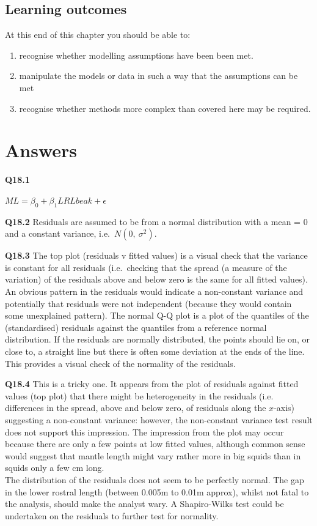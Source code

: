 \documentclass[
  oneside]{krantz}
\providecommand{\tightlist}{%
  \setlength{\itemsep}{0pt}\setlength{\parskip}{0pt}}
\begin{document}
\hypertarget{learning-outcomes-10}{%
\subsection{Learning outcomes}\label{learning-outcomes-10}}

At this end of this chapter you should be able to:

\begin{enumerate}
\def\labelenumi{\arabic{enumi}.}
\tightlist
\item
  recognise whether modelling assumptions have been been met.
\item
  manipulate the models or data in such a way that the assumptions can be met
\item
  recognise whether methods more complex than covered here may be required.
\end{enumerate}

\hypertarget{ANSdiag}{%
\section{Answers}\label{ANSdiag}}

\textbf{Q18.1}

\(ML= \beta_0+\beta_1LRLbeak+ \epsilon\)

\textbf{Q18.2} Residuals are assumed to be from a normal distribution with a mean = 0 and a constant variance, i.e.~\(N(0,\ {\sigma{}}^2)\).

\textbf{Q18.3} The top plot (residuals v fitted values) is a visual check that the variance is
constant for all residuals (i.e.~checking that the spread (a measure of the
variation) of the residuals above and below zero is the same for all fitted
values). An obvious pattern in the residuals would indicate a non-constant
variance and potentially that residuals were not independent (because they would
contain some unexplained pattern).
The normal Q-Q plot is a plot of the quantiles of the (standardised) residuals
against the quantiles from a reference normal distribution. If the residuals are
normally distributed, the points should lie on, or close to, a straight line but
there is often some deviation at the ends of the line. This provides a visual
check of the normality of the residuals.

\textbf{Q18.4} This is a tricky one. It appears from the plot of residuals against fitted
values (top plot) that there might be heterogeneity in the residuals (i.e.
differences in the spread, above and below zero, of residuals along the
\(x\)-axis) suggesting a non-constant variance: however, the non-constant
variance test result does not support this impression. The impression from the
plot may occur because there are only a few points at low fitted values, although
common sense would suggest that mantle length might vary rather more in big
squids than in squids only a few cm long.\\
The distribution of the residuals does not seem to be perfectly normal. The gap
in the lower rostral length (between 0.005m to 0.01m approx), whilst not fatal to
the analysis, should make the analyst wary. A Shapiro-Wilks test could be
undertaken on the residuals to further test for normality.
\end{document}
